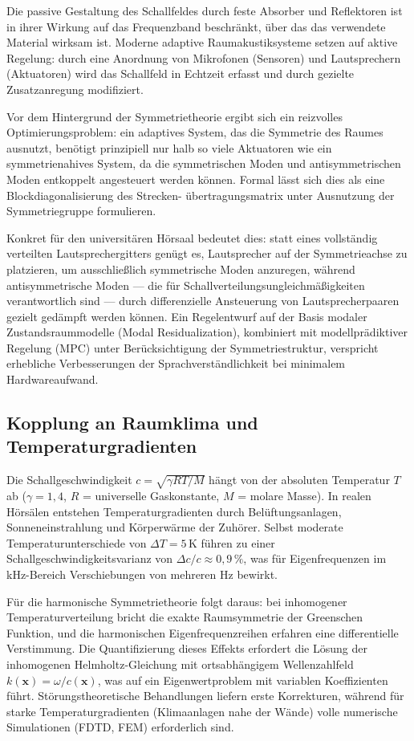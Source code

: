 ﻿\documentclass[12pt, a4paper]{article}
\theoremstyle{definition}
\theoremstyle{remark}
\begin{document}
Die passive Gestaltung des Schallfeldes durch feste Absorber
und Reflektoren ist in ihrer Wirkung auf das Frequenzband
beschränkt, über das das verwendete Material wirksam ist.
Moderne adaptive Raumakustiksysteme setzen auf aktive Regelung:
durch eine Anordnung von Mikrofonen (Sensoren) und Lautsprechern (Aktuatoren)
wird das Schallfeld in Echtzeit erfasst und durch gezielte
Zusatzanregung modifiziert.

Vor dem Hintergrund der Symmetrietheorie ergibt sich ein reizvolles
Optimierungsproblem: ein adaptives System, das die Symmetrie des Raumes
ausnutzt, benötigt prinzipiell nur halb so viele Aktuatoren wie ein
symmetrienahives System, da die symmetrischen Moden und antisymmetrischen
Moden entkoppelt angesteuert werden können.
Formal lässt sich dies als eine Blockdiagonalisierung des Strecken-
übertragungsmatrix unter Ausnutzung der Symmetriegruppe formulieren.

Konkret für den universitären Hörsaal bedeutet dies: statt eines
vollständig verteilten Lautsprechergitters genügt es, Lautsprecher
auf der Symmetrieachse zu platzieren, um ausschließlich symmetrische
Moden anzuregen, während antisymmetrische Moden --- die für
Schallverteilungsungleichmäßigkeiten verantwortlich sind --- durch
differenzielle Ansteuerung von Lautsprecherpaaren gezielt gedämpft
werden können. Ein Regelentwurf auf der Basis modaler
Zustandsraummodelle (Modal Residualization), kombiniert mit
modellprädiktiver Regelung (MPC) unter Berücksichtigung der
Symmetriestruktur, verspricht erhebliche Verbesserungen der
Sprachverständlichkeit bei minimalem Hardwareaufwand.

\subsection{Kopplung an Raumklima und Temperaturgradienten}

Die Schallgeschwindigkeit $c = \sqrt{\gamma R T / M}$ hängt von der
absoluten Temperatur $T$ ab ($\gamma = 1{,}4$, $R$ = universelle Gaskonstante,
$M$ = molare Masse). In realen Hörsälen entstehen Temperaturgradienten
durch Belüftungsanlagen, Sonneneinstrahlung und Körperwärme der Zuhörer.
Selbst moderate Temperaturunterschiede von $\Delta T = 5\,\mathrm{K}$
führen zu einer Schallgeschwindigkeitsvarianz von $\Delta c / c \approx 0{,}9\,\%$,
was für Eigenfrequenzen im kHz-Bereich Verschiebungen von mehreren Hz
bewirkt.

Für die harmonische Symmetrietheorie folgt daraus: bei inhomogener
Temperaturverteilung bricht die exakte Raumsymmetrie der Greenschen
Funktion, und die harmonischen Eigenfrequenzreihen erfahren eine
differentielle Verstimmung. Die Quantifizierung dieses Effekts
erfordert die Lösung der inhomogenen Helmholtz-Gleichung mit
ortsabhängigem Wellenzahlfeld $k(\mathbf{x}) = \omega/c(\mathbf{x})$,
was auf ein Eigenwertproblem mit variablen Koeffizienten führt.
Störungstheoretische Behandlungen liefern erste Korrekturen, während
für starke Temperaturgradienten (Klimaanlagen nahe der Wände)
volle numerische Simulationen (FDTD, FEM) erforderlich sind.
\end{document}
